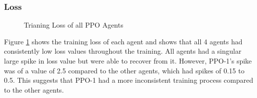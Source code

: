 \subsubsection*{Loss}
\begin{figure}[H]
    \centering
    \caption{Trianing Loss of all PPO Agents}
    \label{fig:PPO_training_loss}
\end{figure}

Figure \ref{fig:PPO_training_loss} shows the training loss of each agent and shows that all 4 agents had consistently low loss values throughout the training. All agents had a singular large spike in loss value but were able to recover from it. However, PPO-1's spike was of a value of 2.5 compared to the other agents, which had spikes of 0.15 to 0.5. This suggests that PPO-1 had a more inconsistent training process compared to the other agents. 

